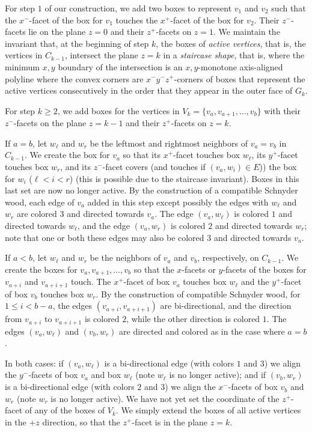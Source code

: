 \documentclass{article}
\newcommand{\df}{\textit}
\begin{document}
For step $1$ of our construction, we add two boxes to represent $v_1$ and $v_2$
 such that the $x^-$-facet of the box for $v_1$ touches the $x^+$-facet of the box for $v_2$.
Their $z^-$-facets lie on the plane $z=0$ and their $z^+$-facets on $z=1$.
We maintain the invariant that, at the beginning of step $k$,
the boxes of \df{active vertices}, that
is, the vertices in $C_{k-1}$,
intersect the plane $z=k$ in a \df{staircase shape}, that is, where
the minimum $x,y$ boundary of the intersection is an $x,y$-monotone
axis-aligned polyline where the convex corners are $x^-y^-z^+$-corners
of boxes that represent the active vertices consecutively in the order
that they appear in the outer face of $G_k$.




For step $k\geq 2$,
we add boxes for the vertices in $V_k = \{ v_a, v_{a+1}, \ldots, v_b \}$
with their $z^-$-facets on the plane $z=k-1$ and their $z^+$-facets on
$z=k$.

 If $a=b$, let $w_\ell$ and $w_r$ be the leftmost and rightmost neighbors of $v_a=v_b$ in $C_{k-1}$.
We create the box for $v_a$ so that
its $x^+$-facet touches box $w_\ell$,
its $y^+$-facet touches box $w_r$, and
its $z^-$-facet covers (and touches if $(v_a,w_i) \in E$)) the
 box for $w_i$ ($\ell < i < r$)
(this is possible due to the staircase invariant).
Boxes in this last set are now no longer
active. By the construction of a compatible Schnyder wood, each edge of $v_a$ added
in this step except possibly the edges with $w_\ell$ and $w_r$
are colored $3$ and directed towards $v_a$. The edge $(v_a,w_\ell)$
is colored $1$ and directed towards $w_\ell$, and the edge $(v_a,w_r)$ is
colored $2$ and directed towards $w_r$; note that one or both these edges may
also be colored $3$ and directed towards $v_a$.

If $a < b$, let $w_\ell$ and $w_r$ be the neighbors of $v_a$ and
$v_b$, respectively, on $C_{k-1}$.
We create the boxes for $v_a, v_{a+1}, \dots, v_b$ so that
the $x$-facets or $y$-facets of the boxes for $v_{a+i}$ and
$v_{a+i+1}$ touch.
The $x^+$-facet of box $v_a$ touches box $w_\ell$ and the $y^+$-facet of
box $v_b$ touches box $w_r$.
By the construction of compatible Schnyder wood, for $1\leq i<b-a$,
the edges $(v_{a+i},v_{a+i+1})$ are bi-directional, and the direction from $v_{a+i}$
to $v_{a+i+1}$ is colored $2$, while the other direction is colored $1$. The edges
$(v_a,w_\ell)$ and $(v_b,w_r)$ are directed and colored as in the case where $a=b$.

In both cases:
if $(v_a, w_\ell)$ is a bi-directional edge (with colors $1$ and $3$)
we align the $y^-$-facets of box $v_a$ and box $w_\ell$ (note
$w_\ell$ is no longer active); and
if $(v_b, w_r)$ is a bi-directional edge (with colors $2$ and $3$)
we align the $x^-$-facets of box $v_b$ and $w_r$ (note $w_r$
is no longer active).
We have not yet set the coordinate of the $z^+$-facet of any of the boxes of $V_k$. We simply
extend the boxes of all active vertices in the $+z$ direction, so that the $z^+$-facet is in
the plane $z=k$.
\end{document}

